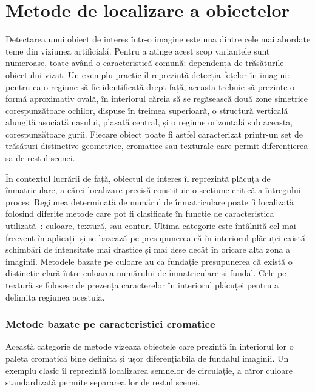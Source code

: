 \chapter{Metode de localizare a obiectelor}
\label{chap:localizare}

\indent\par
Detectarea unui obiect de interes într-o imagine este una dintre cele mai abordate teme din viziunea artificială. Pentru a atinge acest scop variantele sunt numeroase, toate având o caracteristică comună: dependența de trăsăturile obiectului vizat. Un exemplu practic îl reprezintă detecția fețelor în imagini: pentru ca o regiune să fie identificată drept față, aceasta trebuie să prezinte o formă aproximativ ovală, în interiorul căreia să se regăsească două zone simetrice corespunzătoare ochilor, dispuse în treimea superioară, o structură verticală alungită asociată nasului, plasată central, și o regiune orizontală sub aceasta, corespunzătoare gurii. Fiecare obiect poate fi astfel caracterizat printr-un set de trăsături distinctive geometrice, cromatice sau texturale care permit diferențierea sa de restul scenei.

În contextul lucrării de față, obiectul de interes îl reprezintă plăcuța de înmatriculare, a cărei localizare precisă constituie o secțiune critică a întregului proces. Regiunea determinată de numărul de înmatriculare poate fi localizată folosind diferite metode care pot fi clasificate în funcție de caracteristica utilizată~\cite{SOAReview}: culoare, textură, sau contur. Ultima categorie este întâlnită cel mai frecvent în aplicații și se bazează pe presupunerea că în interiorul plăcuței există schimbări de intensitate mai drastice și mai dese decât în oricare altă zonă a imaginii. Metodele bazate pe culoare au ca fundație presupunerea că există o distincție clară între culoarea numărului de înmatriculare și fundal. Cele pe textură se folosesc de prezența caracterelor în interiorul plăcuței pentru a delimita regiunea acestuia.

\subsection{Metode bazate pe caracteristici cromatice}
\indent\par
Această categorie de metode vizează obiectele care prezintă în interiorul lor o paletă cromatică bine definită și ușor diferențiabilă de fundalul imaginii. Un exemplu clasic îl reprezintă localizarea semnelor de circulație, a căror culoare standardizată permite separarea lor de restul scenei.

